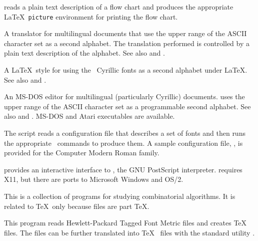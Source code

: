 
 reads a plain text description of a flow chart and 
produces the appropriate \LaTeX\ \verb|picture| environment for
printing the flow chart.

\newpage
{}

A translator for multilingual documents that use the upper range of
the ASCII character set as a second alphabet.  The translation performed
is controlled by a plain text description of the alphabet.  See also
 and .


A \LaTeX\ style for using the \AmS\ Cyrillic fonts as a second alphabet
under \LaTeX.  See also  and .


An MS-DOS editor for multilingual (particularly Cyrillic) documents.
 uses the upper range of the ASCII character
set as a programmable second alphabet.  See also 
and .  MS-DOS and Atari executables are available.


The  script reads a configuration file that describes
a set of fonts and then runs the appropriate
\MF\ commands to produce them.  A sample configuration file,
, is provided for the Computer Modern Roman family.


 provides an interactive interface to ,
the GNU PostScript interpreter.   requires X11, but 
there are ports to Microsoft Windows and OS/2.


This is a collection of  programs for studying combinatorial
algorithms.  It is related to \TeX\ only because  files are
part \TeX.


This program reads Hewlett-Packard Tagged Font Metric files and
creates \TeX\  files.  The  files can be further
translated into \TeX\  files with the standard utility
.

